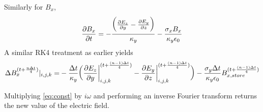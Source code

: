 \documentclass[]{article}
\begin{document}
		Similarly for $B_{x}$,
		\begin{equation}
			\pdv{B_{x}}{t} = -\frac{\bigg(\pdv{E_{z}}{y} - \pdv{E_{y}}{z}\bigg)}{\kappa_{y}} - \frac{\sigma_{x}B_{x}}{\kappa_{y}\epsilon_{0}}
		\end{equation}
		A similar RK4 treatment as earlier yields 
		\begin{align*}
			\Delta B_{x}^{(t+\frac{n\Delta t}{4})}|_{i, j, k} = 
			& -\frac{\Delta t}{\kappa_{y}}\bigg(\pdv{E_{z}}{y}\bigg|^{(t + \frac{(n-1)\Delta t}{4})}_{i, j, k} - \pdv{E_{y}}{z}\bigg|^{(t  + \frac{(n-1)\Delta t}{4})}_{i, j, k}\bigg) - \frac{\sigma_{y}\Delta t}{\kappa_{y}\epsilon_{0}}B_{x, store}^{(t + \frac{(n-1)\Delta t}{4})}\\
		\end{align*}
		
		Multiplying \eqref{eq:const} by $i\omega$ and performing an inverse Fourier transform returns the new value of the electric field.
\end{document}
